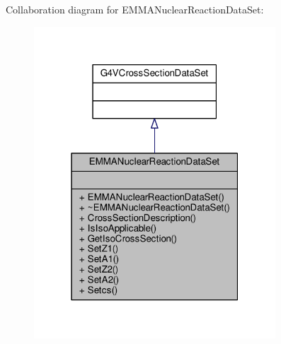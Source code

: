 Collaboration diagram for E\+M\+M\+A\+Nuclear\+Reaction\+Data\+Set\+:
\nopagebreak
\begin{figure}[H]
\begin{center}
\leavevmode
\includegraphics[width=256pt]{classEMMANuclearReactionDataSet__coll__graph}
\end{center}
\end{figure}
